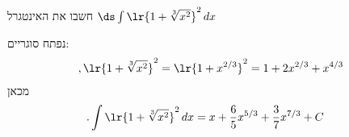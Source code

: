 חשבו את האינטגרל
$\ds \int \lr{1+\sqrt[3]{x^2}}^2\, dx$
\begin{solbox}
נפתח סוגריים:
\begin{align*}
,\lr{1+\sqrt[3]{x^2}}^2=\lr{1+x^{2/3}}^2=1+2x^{2/3}+x^{4/3}
\end{align*}
מכאן
\begin{align*}
.\int \lr{1+\sqrt[3]{x^2}}^2\,dx
&=x+\frac{6}{5}x^{5/3}+\frac{3}{7}x^{7/3}+C
\end{align*}
\end{solbox}
